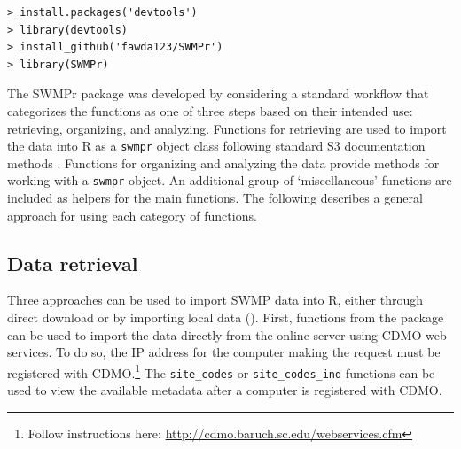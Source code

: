 \documentclass[10pt,letterpaper]{article}\usepackage[]{graphicx}\usepackage[]{color}
\makeatletter
\newenvironment{kframe}{%
 \def\at@end@of@kframe{}%
 \ifinner\ifhmode%
  \def\at@end@of@kframe{\end{minipage}}%
  \begin{minipage}{\columnwidth}%
 \fi\fi%
 \def\FrameCommand##1{\hskip\@totalleftmargin \hskip-\fboxsep
 \colorbox{shadecolor}{##1}\hskip-\fboxsep
     \hskip-\linewidth \hskip-\@totalleftmargin \hskip\columnwidth}%
 \MakeFramed {\advance\hsize-\width
   \@totalleftmargin\z@ \linewidth\hsize
   \@setminipage}}%
 {\par\unskip\endMakeFramed%
 \at@end@of@kframe}
\newenvironment{knitrout}{}{} %
\makeatother
\begin{document}
\begin{knitrout}
\color{fgcolor}\begin{kframe}
\begin{verbatim}
> install.packages('devtools')
> library(devtools)
> install_github('fawda123/SWMPr')
> library(SWMPr)
\end{verbatim}
\end{kframe}
\end{knitrout}


The SWMPr package was developed by considering a standard workflow that categorizes the functions as one of three steps based on their intended use: retrieving, organizing, and analyzing.  Functions for retrieving are used to import the data into R as a \texttt{swmpr} object class following standard S3 documentation methods \cite{Wickham14}.  Functions for organizing and analyzing the data provide methods for working with a \texttt{swmpr} object.  An additional group of `miscellaneous' functions are included as helpers for the main functions.  The following describes a general approach for using each category of functions.

\subsection*{Data retrieval}

Three approaches can be used to import \ac{SWMP} data into R, either through direct download or by importing local data (). First, functions from the package can be used to import the data directly from the online server using \ac{CDMO} web services. To do so, the IP address for the computer making the request must be registered with \ac{CDMO}.\footnote{Follow instructions here: \url{http://cdmo.baruch.sc.edu/webservices.cfm}}  The \texttt{site\_codes} or \texttt{site\_codes\_ind} functions can be used to view the available metadata after a computer is registered with \ac{CDMO}. 
\end{document}
